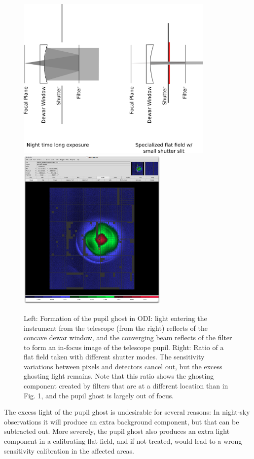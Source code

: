 \documentclass[draft]{spieman}
\begin{document}
\begin{figure}
	\includegraphics[height=8cm]{images/odishutterpupilghostsupression.png}
	\hspace{0.5cm} \includegraphics[height=8cm]{images/odi_layeronepg.png}
	
	\caption{ \label{fig_pupilghost}Left: Formation of the pupil ghost in ODI:  light 
		entering the instrument from the telescope (from the right) reflects of the
		concave dewar window, and the converging beam reflects of the filter to
		form an in-focus image of the telescope pupil. Right: Ratio of a flat
		field taken with different shutter modes. The sensitivity variations between
		pixels and detectors cancel out, but the excess ghosting light remains. Note
		that this ratio shows the ghosting component created by filters that are at
		a different location than in Fig. 1, and the pupil ghost is largely out of
		focus.}
	
\end{figure}

The excess light of the pupil ghost is undesirable for several reasons: In
night-sky observations it will produce an extra background component, but that
can be subtracted out. More severely, the pupil ghost also produces an extra
light component in a calibrating flat field, and if not treated, would lead to a
wrong sensitivity calibration in the affected areas.
\end{document}
